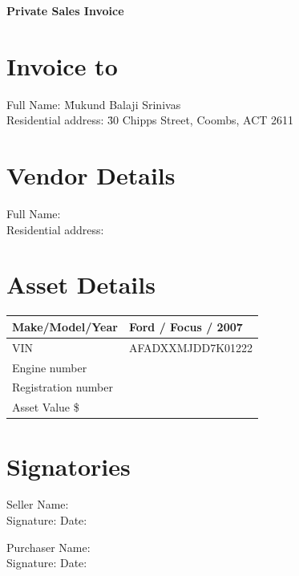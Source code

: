 \documentclass[12pt,a4paper]{article}
\begin{document}
\begin{center}
    {\LARGE \textbf{Private Sales Invoice}}
\end{center}

\section*{Invoice to}
\begin{tabbing}
    Full Name: \= Mukund Balaji Srinivas \\
    Residential address: \= 30 Chipps Street, Coombs, ACT 2611 \\
\end{tabbing}

\section*{Vendor Details}
\begin{tabbing}
    Full Name: \= \underline{\hspace{8cm}} \\
    Residential address: \= \underline{\hspace{8cm}} \\
\end{tabbing}

\section*{Asset Details}
\renewcommand{\arraystretch}{1.3}
\begin{longtable}{|p{6cm}|p{8cm}|}
\hline
Make/Model/Year & Ford / Focus / 2007 \\ \hline
VIN & AFADXXMJDD7K01222 \\ \hline
Engine number & \\ \hline
Registration number & \\ \hline
Asset Value \$ & \\ \hline
\end{longtable}

\section*{Signatories}
\begin{tabbing}
    Seller Name: \= \underline{\hspace{2cm}} \\
    Signature: \= \underline{\hspace{2cm}} Date: \underline{\hspace{2.5cm}} \\
\end{tabbing}

\begin{tabbing}
    Purchaser Name: \= \underline{\hspace{2cm}} \\
    Signature: \= \underline{\hspace{2cm}} Date: \underline{\hspace{2.5cm}} \\
\end{tabbing}
\end{document}
